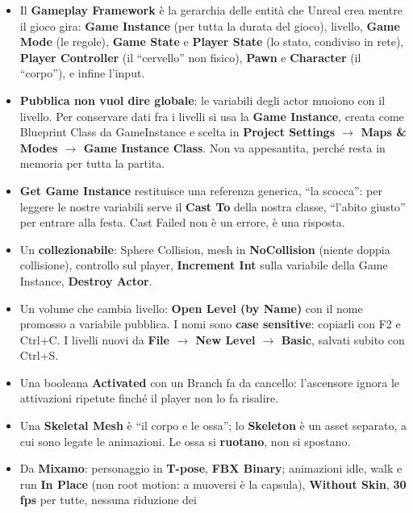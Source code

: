 \begin{itemize}
  \item Il \textbf{Gameplay Framework} è la gerarchia delle entità che Unreal crea mentre
        il gioco gira: \textbf{Game Instance} (per tutta la durata del gioco), livello,
        \textbf{Game Mode} (le regole), \textbf{Game State} e \textbf{Player State} (lo
        stato, condiviso in rete), \textbf{Player Controller} (il ``cervello'' non
        fisico), \textbf{Pawn} e \textbf{Character} (il ``corpo''), e infine l'input.
  \item \textbf{Pubblica non vuol dire globale}: le variabili degli actor muoiono con il
        livello. Per conservare dati fra i livelli si usa la \textbf{Game Instance},
        creata come Blueprint Class da GameInstance e scelta in \textbf{Project Settings
        $\rightarrow$ Maps \& Modes $\rightarrow$ Game Instance Class}. Non va
        appesantita, perché resta in memoria per tutta la partita.
  \item \textbf{Get Game Instance} restituisce una referenza generica, ``la scocca'':
        per leggere le nostre variabili serve il \textbf{Cast To} della nostra classe,
        ``l'abito giusto'' per entrare alla festa. Cast Failed non è un errore, è una
        risposta.
  \item Un \textbf{collezionabile}: Sphere Collision, mesh in \textbf{NoCollision} (niente
        doppia collisione), controllo sul player, \textbf{Increment Int} sulla variabile
        della Game Instance, \textbf{Destroy Actor}.
  \item Un volume che cambia livello: \textbf{Open Level (by Name)} con il nome promosso
        a variabile pubblica. I nomi sono \textbf{case sensitive}: copiarli con F2 e
        Ctrl+C. I livelli nuovi da \textbf{File $\rightarrow$ New Level $\rightarrow$
        Basic}, salvati subito con Ctrl+S.
  \item Una booleana \textbf{Activated} con un Branch fa da cancello: l'ascensore
        ignora le attivazioni ripetute finché il player non lo fa risalire.
  \item Una \textbf{Skeletal Mesh} è ``il corpo e le ossa''; lo \textbf{Skeleton} è un
        asset separato, a cui sono legate le animazioni. Le ossa si \textbf{ruotano},
        non si spostano.
  \item Da \textbf{Mixamo}: personaggio in \textbf{T-pose}, \textbf{FBX Binary};
        animazioni idle, walk e run \textbf{In Place} (non root motion: a muoversi è la
        capsula), \textbf{Without Skin}, \textbf{30 fps} per tutte, nessuna riduzione dei

\end{itemize}
